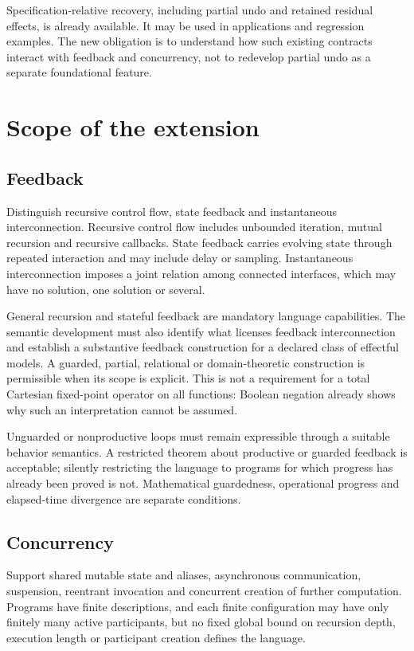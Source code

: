 \documentclass[11pt,a4paper]{article}
\begin{document}
Specification-relative recovery, including partial undo and retained residual effects, is already available. It may be used in applications and regression examples. The new obligation is to understand how such existing contracts interact with feedback and concurrency, not to redevelop partial undo as a separate foundational feature.

\section{Scope of the extension}\label{sec:scope}

\subsection{Feedback}
Distinguish recursive control flow, state feedback and instantaneous interconnection. Recursive control flow includes unbounded iteration, mutual recursion and recursive callbacks. State feedback carries evolving state through repeated interaction and may include delay or sampling. Instantaneous interconnection imposes a joint relation among connected interfaces, which may have no solution, one solution or several.

General recursion and stateful feedback are mandatory language capabilities. The semantic development must also identify what licenses feedback interconnection and establish a substantive feedback construction for a declared class of effectful models. A guarded, partial, relational or domain-theoretic construction is permissible when its scope is explicit. This is not a requirement for a total Cartesian fixed-point operator on all functions: Boolean negation already shows why such an interpretation cannot be assumed.

Unguarded or nonproductive loops must remain expressible through a suitable behavior semantics. A restricted theorem about productive or guarded feedback is acceptable; silently restricting the language to programs for which progress has already been proved is not. Mathematical guardedness, operational progress and elapsed-time divergence are separate conditions.

\subsection{Concurrency}
Support shared mutable state and aliases, asynchronous communication, suspension, reentrant invocation and concurrent creation of further computation. Programs have finite descriptions, and each finite configuration may have only finitely many active participants, but no fixed global bound on recursion depth, execution length or participant creation defines the language.
\end{document}
